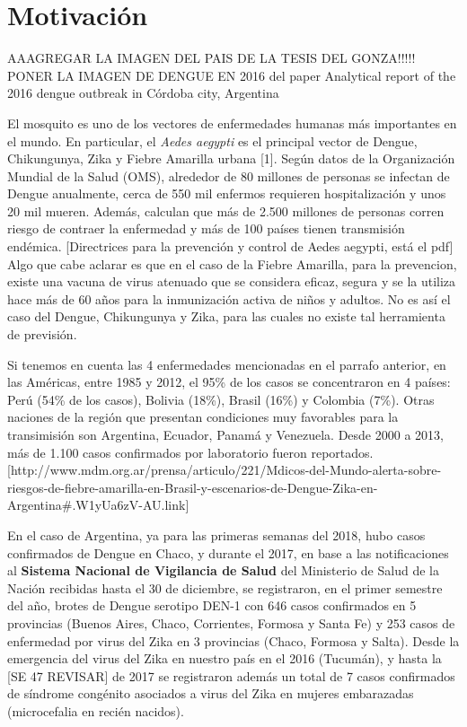 



\chapter{Motivación}

AAAGREGAR LA IMAGEN DEL PAIS DE LA TESIS DEL GONZA!!!!!
PONER LA IMAGEN DE DENGUE EN 2016 del paper Analytical report of the 2016 dengue outbreak in Córdoba city, Argentina
\justifying
\par El mosquito es uno de los vectores de enfermedades humanas más importantes
  en el mundo. En particular, el \textit{Aedes aegypti} es el principal vector
  de Dengue, Chikungunya, Zika y Fiebre Amarilla urbana [1].
  Según datos de la Organización Mundial de la Salud (OMS), alrededor de 80 millones de
  personas se infectan de Dengue anualmente, cerca de 550 mil enfermos requieren hospitalización y
  unos 20 mil mueren. Además, calculan que más de 2.500 millones de personas corren
  riesgo de contraer la enfermedad y más de 100 países tienen transmisión endémica.
  [Directrices para la prevención y control de Aedes aegypti, está el pdf]
  Algo que cabe aclarar es que en el caso de la Fiebre Amarilla, para la
  prevencion, existe una vacuna de virus atenuado que se considera eficaz, segura
  y se la utiliza hace más de 60 años para la inmunización activa de niños y
  adultos. No es así el caso del Dengue,
  Chikungunya y Zika, para las cuales no existe tal herramienta de previsión.

\par Si tenemos en cuenta las 4 enfermedades mencionadas en el parrafo anterior,
  en las Américas, entre 1985 y 2012, el 95\% de los casos se concentraron en
  4 países: Perú (54\% de los casos), Bolivia (18\%), Brasil (16\%) y Colombia (7\%).
  Otras naciones de la región que presentan condiciones muy
  favorables para la transimisión son Argentina, Ecuador, Panamá y Venezuela.
  Desde 2000 a 2013, más de 1.100 casos confirmados por laboratorio fueron
  reportados.
  [http://www.mdm.org.ar/prensa/articulo/221/Mdicos-del-Mundo-alerta-sobre-riesgos-de-fiebre-amarilla-en-Brasil-y-escenarios-de-Dengue-Zika-en-Argentina\#.W1yUa6zV-AU.link]

\par En el caso de Argentina, ya para las primeras semanas del 2018, hubo casos confirmados
  de Dengue en Chaco, y durante el 2017, en base a las notificaciones al
  \textbf{Sistema Nacional de Vigilancia de Salud} del Ministerio de Salud de la Nación
  recibidas hasta el 30 de diciembre, se registraron, en el primer semestre del año, brotes de
  Dengue serotipo DEN-1 con 646 casos confirmados en 5 provincias
  (Buenos Aires, Chaco, Corrientes, Formosa y Santa Fe) y 253 casos de enfermedad
  por virus del Zika en 3 provincias (Chaco, Formosa y Salta).
  Desde la emergencia del virus del Zika en nuestro país en el 2016 (Tucumán), y hasta
  la [SE 47 REVISAR] de 2017 se registraron además un total de 7 casos confirmados de
  síndrome congénito asociados a virus del Zika en mujeres embarazadas
  (microcefalia en recién nacidos).

